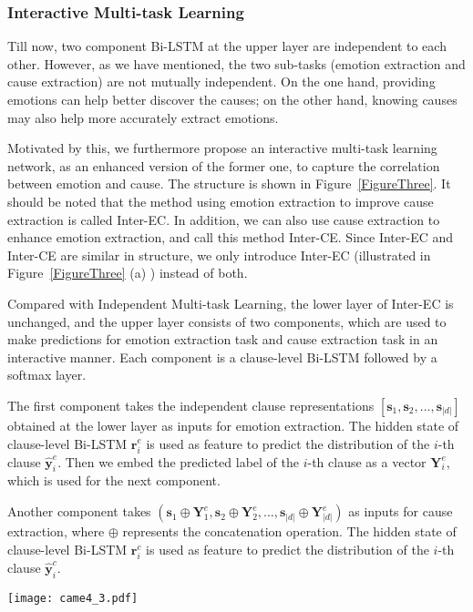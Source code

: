 \documentclass[11pt,a4paper]{article}
\begin{document}
\subsubsection{Interactive Multi-task Learning}
Till now, two component Bi-LSTM at the upper layer are independent to each other. However, as we have mentioned, the two sub-tasks (emotion extraction and cause extraction) are not mutually independent. On the one hand, providing emotions can help better discover the causes; on the other hand, knowing causes may also help more accurately extract emotions.

Motivated by this, we furthermore propose an interactive multi-task learning network, as an enhanced version of the former one, to capture the correlation between emotion and cause. The structure is shown in Figure~\ref{FigureThree}. It should be noted that the method using emotion extraction to improve cause extraction is called Inter-EC. In addition, we can also use cause extraction to enhance emotion extraction, and call this method Inter-CE. Since Inter-EC and Inter-CE are similar in structure, we only introduce Inter-EC (illustrated in Figure~\ref{FigureThree} (a) ) instead of both.

Compared with Independent Multi-task Learning, the lower layer of Inter-EC is unchanged, and the upper layer consists of two components, which are used to make predictions for emotion extraction task and cause extraction task in an interactive manner. Each component is a clause-level Bi-LSTM followed by a softmax layer.

The first component takes the independent clause representations  $ [\mathbf{s}_1,\mathbf{s}_2,...,\mathbf{s}_{|d|} ] $ obtained at the lower layer as inputs for emotion extraction. The hidden state of clause-level Bi-LSTM  $ \mathbf{r}_i^{e} $ is used as feature to predict the distribution of the $ i $-th clause  $ \hat{\mathbf{y}}_i^{e} $. Then we embed the predicted label of the $ i $-th clause as a vector  $ \mathbf{Y}_i^{e} $, which is used for the next component.

Another component takes $ ( \mathbf{s}_1 \oplus \mathbf{Y}^{e}_1, \mathbf{s}_2 \oplus \mathbf{Y}^{e}_2,..., \mathbf{s}_{|d|} \oplus \mathbf{Y}^{e}_{|d|}  ) $ as inputs for cause extraction, where $ \oplus $ represents the concatenation operation. The hidden state of clause-level Bi-LSTM $ \mathbf{r}_i^{c} $ is used as feature to predict the distribution of the $ i $-th clause  $ \hat{\mathbf{y}}_i^{c} $.

\begin{figure*}
	\centering
	\texttt{[image: came4\_3.pdf]}
	\caption{Two Models for Interactive Multi-task Learning: (a) Inter-EC, which uses emotion extraction to improve cause extraction (b) Inter-CE, which uses cause extraction to enhance emotion extraction.}
	\label{FigureThree}
\end{figure*}
\end{document}
